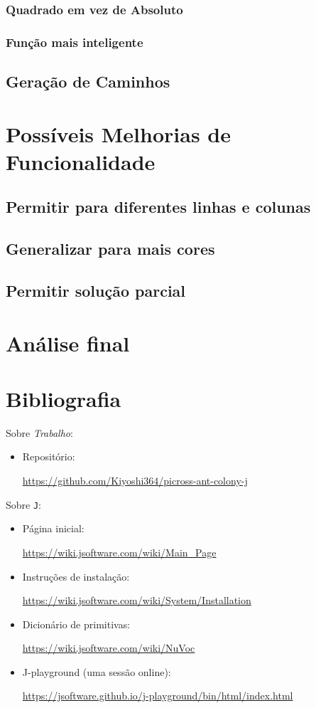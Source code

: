 \documentclass{article}
\newcommand{\lang}{\texttt{J}}
\begin{document}
\subsubsection{Quadrado em vez de Absoluto}
\subsubsection{Função mais inteligente}

\subsection{Geração de Caminhos}

\section{Possíveis Melhorias de Funcionalidade}
\subsection{Permitir para diferentes linhas e colunas}
\subsection{Generalizar para mais cores}
\subsection{Permitir solução parcial}

\section{Análise final}

\section{Bibliografia} \label{s:bib}

Sobre \emph{Trabalho}:
\begin{itemize}
    \item Repositório: \par
    \url{https://github.com/Kiyoshi364/picross-ant-colony-j}
\end{itemize}

\noindent
Sobre \lang{}:
\begin{itemize}
    \item Página inicial: \par
        \url{https://wiki.jsoftware.com/wiki/Main_Page}
    \item Instruções de instalação: \par
        \url{https://wiki.jsoftware.com/wiki/System/Installation}
    \item Dicionário de primitivas: \par
        \url{https://wiki.jsoftware.com/wiki/NuVoc}
    \item J-playground (uma sessão online): \par
        \url{https://jsoftware.github.io/j-playground/bin/html/index.html}
\end{itemize}
\end{document}
